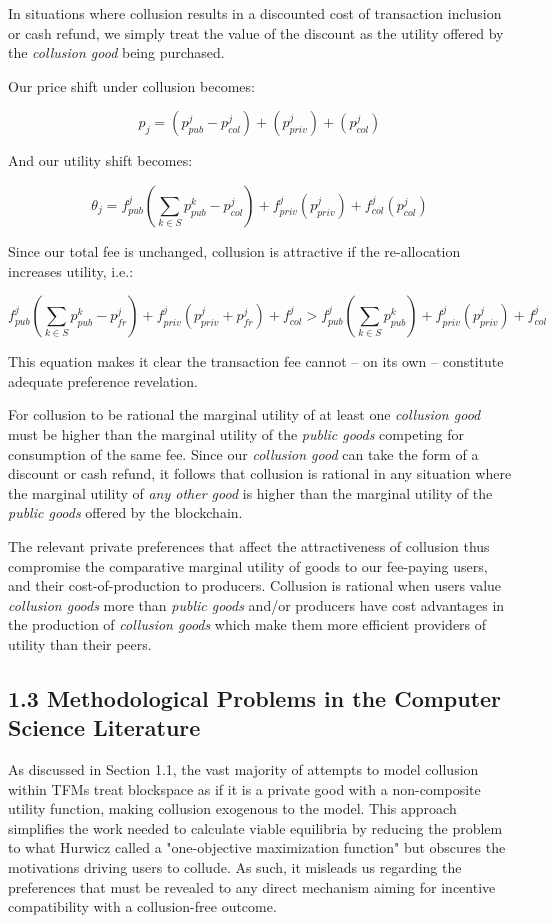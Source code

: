 \documentclass[oneside]{article}   	%
\begin{document}
In situations where collusion results in a discounted cost of transaction inclusion or cash refund, we simply treat the value of the discount as the utility offered by the \textit{collusion good} being purchased.

Our price shift under collusion becomes:

$$
p_j = \left( p_{pub}^j - p_{col}^j \right) + \left( p_{priv}^j \right) + \left( p_{col}^j \right)
$$

And our utility shift becomes:

$$
\theta_j = f_{pub}^j\left(\sum_{k \in S} p_{pub}^{k} - p_{col}^j \right) + f_{priv}^j\left( p_{priv}^j \right) + f_{col}^j\left(p_{col}^j \right)
$$

Since our total fee is unchanged, collusion is attractive if the re-allocation increases utility, i.e.:

\[
f_{pub}^j\left(\sum_{k \in S} p_{pub}^{k} - p_{fr}^j \right) + f_{priv}^j( p_{priv}^j + p_{fr}^j ) + f_{col}^j
>
f_{pub}^j\left(\sum_{k \in S} p_{pub}^{k}\right) + f_{priv}^j(p_{priv}^j) + f_{col}^j
\]

This equation makes it clear the transaction fee cannot -- on its own -- constitute adequate preference revelation.

For collusion to be rational the marginal utility of at least one \textit{collusion good} must be higher than the marginal utility of the \textit{public goods} competing for consumption of the same fee. Since our \textit{collusion good} can take the form of a discount or cash refund, it follows that collusion is rational in any situation where the marginal utility of \textit{any other good} is higher than the marginal utility of the \textit{public goods} offered by the blockchain.

The relevant private preferences that affect the attractiveness of collusion thus compromise the comparative marginal utility of goods to our fee-paying users, and their cost-of-production to producers. Collusion is rational when users value \textit{collusion goods} more than \textit{public goods} and/or producers have cost advantages in the production of \textit{collusion goods} which make them more efficient providers of utility than their peers.

\subsection*{1.3 Methodological Problems in the Computer Science Literature}

As discussed in Section 1.1, the vast majority of attempts to model collusion within TFMs treat blockspace as if it is a private good with a non-composite utility function, making collusion exogenous to the model. This approach simplifies the work needed to calculate viable equilibria by reducing the problem to what Hurwicz called a "one-objective maximization function" but obscures the motivations driving users to collude. As such, it misleads us regarding the preferences that must be revealed to any direct mechanism aiming for incentive compatibility with a collusion-free outcome. 
\end{document}
